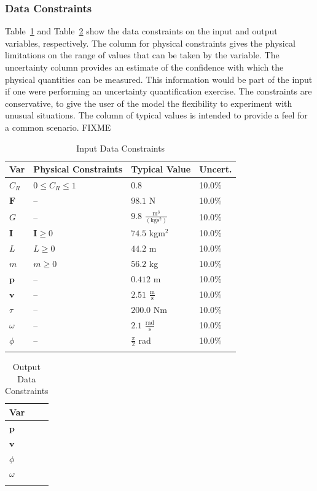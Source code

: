 \documentclass[12pt]{article}
\begin{document}
\subsubsection{Data Constraints}
\label{Sec:DataConstraints}
Table~\ref{Table:InDataConstraints} and Table~\ref{Table:OutDataConstraints} show the data constraints on the input and output variables, respectively. The column for physical constraints gives the physical limitations on the range of values that can be taken by the variable. The uncertainty column provides an estimate of the confidence with which the physical quantities can be measured. This information would be part of the input if one were performing an uncertainty quantification exercise. The constraints are conservative, to give the user of the model the flexibility to experiment with unusual situations. The column of typical values is intended to provide a feel for a common scenario. FIXME
\begin{longtable}{l l l l}
\toprule
Var & Physical Constraints & Typical Value & Uncert.
\\
\midrule
${C_{R}}$ & $0\leq{}{C_{R}}\leq{}1$ & $0.8$ & 10.0\%
\\
$\mathbf{F}$ & -- & $98.1$ N & 10.0\%
\\
$G$ & -- & $9.8$ $\frac{\text{m}^{3}}{(\text{kg}\text{s}^{2})}$ & 10.0\%
\\
$\mathbf{I}$ & $\mathbf{I}\geq{}0$ & $74.5$ kg$\text{m}^{2}$ & 10.0\%
\\
$L$ & $L\geq{}0$ & $44.2$ m & 10.0\%
\\
$m$ & $m\geq{}0$ & $56.2$ kg & 10.0\%
\\
$\mathbf{p}$ & -- & $0.412$ m & 10.0\%
\\
$\mathbf{v}$ & -- & $2.51$ $\frac{\text{m}}{\text{s}}$ & 10.0\%
\\
$τ$ & -- & $200.0$ Nm & 10.0\%
\\
$ω$ & -- & $2.1$ $\frac{\text{rad}}{\text{s}}$ & 10.0\%
\\
$ϕ$ & -- & $\frac{π}{2}$ rad & 10.0\%
\\
\bottomrule
\caption{Input Data Constraints}
\label{Table:InDataConstraints}
\end{longtable}
\begin{longtable}{l}
\toprule
Var
\\
\midrule
$\mathbf{p}$
\\
$\mathbf{v}$
\\
$ϕ$
\\
$ω$
\\
\bottomrule
\caption{Output Data Constraints}
\label{Table:OutDataConstraints}
\end{longtable}
\end{document}
